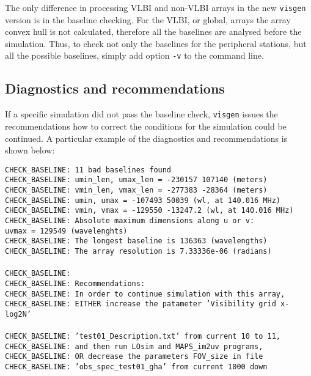 \documentclass[letterpaper, oneside, 11pt]{article}
\begin{document}
The only difference in processing VLBI and non-VLBI arrays in the new {\tt visgen} version  is in the baseline checking. For the VLBI, or global, arrays the array convex hull is not calculated, therefore all the baselines are analysed before the simulation. Thus, to check not only the baselines for the peripheral stations, but all the possible baselines, simply add option {\tt -v} to the command line. \\

\subsection{Diagnostics and recommendations}

If a specific simulation did not pass the baseline check, {\tt visgen} issues the recommendations how to correct the conditions for the simulation could be continued. A particular example of the diagnostics and recommendations is shown below: 
\begin{tabbing}
{\tt CHECK\_BASELINE: 11 bad baselines found} \\
{\tt CHECK\_BASELINE: umin\_len, umax\_len =   -230157    107140 (meters)}\\
{\tt CHECK\_BASELINE: vmin\_len, vmax\_len =   -277383    -28364 (meters)}\\
{\tt CHECK\_BASELINE: umin, umax =      -107493        50039 (wl, at 140.016 MHz)}\\
{\tt CHECK\_BASELINE: vmin, vmax =      -129550     -13247.2 (wl, at 140.016 MHz)}\\
{\tt CHECK\_BASELINE: Absolute maximum dimensions along u or v:} \\
\hspace{35mm} \={\tt uvmax = 129549 (wavelenghts)}\\
{\tt CHECK\_BASELINE: The longest baseline is 136363 (wavelengths)}\\
{\tt CHECK\_BASELINE: The array resolution is 7.33336e-06 (radians) }\\
\\
{\tt CHECK\_BASELINE:  }\\
{\tt CHECK\_BASELINE: Recommendations:}\\
{\tt CHECK\_BASELINE: In order to continue simulation with this array,}\\
{\tt CHECK\_BASELINE: EITHER increase the patameter 'Visibility grid x-log2N'}\\
\\
{\tt CHECK\_BASELINE: 'test01\_Description.txt' from current 10 to 11, }\\
{\tt CHECK\_BASELINE: and then run LOsim and MAPS\_im2uv programs, }\\
{\tt CHECK\_BASELINE: OR decrease the parameters FOV\_size in file }\\
{\tt CHECK\_BASELINE: 'obs\_spec\_test01\_gha' from current 1000 down}\\
\\
\end{tabbing}
\end{document}
